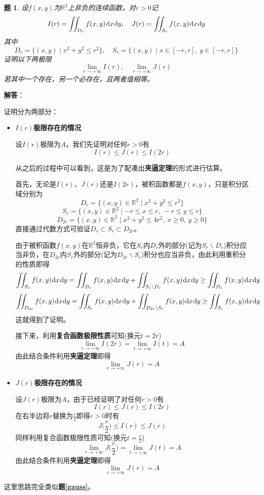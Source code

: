 \documentclass[a4paper,UTF8,fontset=windows,AutoFakeBold]{ctexart}
\newcommand*{\dr}{\hspace{0.07em}\mathrm{d}}
\newcommand*{\rb}{\mathbb{R}}
\newcommand*{\note}{\noindent *}
\theoremstyle{ex}
\newtheorem{exercise}{题}
\newcommand{\exref}[1]{\textbf{题\;\ref{#1}\;}}
\newcommand{\sol}[1]{{\vspace{5pt}\kaishu\noindent\textbf{解答}：\vspace{-3pt}
\begin{compactitem}
    \item[] #1
\end{compactitem}
}}
\begin{document}
\begin{framed}
\begin{exercise}
    设$f(x,y)$为$\rb^2$上非负的连续函数，对$r>0$记
    $$I(r)=\iint_{D_r}f(x,y)\dr x\dr y,\quad J(r)=\iint_{S_r}f(x,y)\dr x\dr y$$
    其中
    $$D_r=\{(x,y)\mid x^2+y^2\le r^2\},\quad S_r=\{(x,y)\mid x\in[-r,r],\ y\in[-r,r]\}$$
    证明以下两极限
    $$\lim_{r\to+\infty}I(r),\quad\lim_{r\to+\infty}J(r)$$
    若其中一个存在，另一个必存在，且两者值相等。
\end{exercise}
\sol{
    证明分为两部分：
    \begin{itemize}
        \item $I(r)$\textbf{极限存在的情况}
        
        设$I(r)$极限为$A$，我们先证明对任何$r>0$有
        $$I(r)\le J(r)\le I(2r)$$

        \note 从之后的过程中可以看到，这是为了配凑出\textbf{夹逼定理}的形式进行估算。

        首先，无论是$I(r)$、$J(r)$还是$I(2r)$，被积函数都是$f(x,y)$，只是积分区域分别为
        $$D_r=\{(x,y)\in\rb^2\mid x^2+y^2\le r^2\}$$
        $$S_r=\{(x,y)\in\rb^2\mid-r\le x\le r,\ -r\le y\le r\}$$
        $$D_{2r}=\{(x,y)\in\rb^2\mid x^2+y^2\le 4r^2,\ x\ge0,\ y\ge0\}$$
        直接通过代数方式可验证$D_r\subset S_r\subset D_{2r}$。

        由于被积函数$f(x,y)$在$\rb^2$恒非负，它在$S_r$内$D_r$外的部分(记为$S_r\backslash D_r$)积分应当非负，在$D_{2r}$内$S_r$外的部分(记为$D_{2r}\backslash S_r$)积分也应当非负，由此利用重积分的性质即得
        $$\iint_{S_r}f(x,y)\dr x\dr y=\iint_{D_r}f(x,y)\dr x\dr y+\iint_{S_r\backslash D_r}f(x,y)\dr x\dr y\ge\iint_{D_r}f(x,y)\dr x\dr y$$
        $$\iint_{D_{2r}}f(x,y)\dr x\dr y=\iint_{S_r}f(x,y)\dr x\dr y+\iint_{D_{2r}\backslash S_r}f(x,y)\dr x\dr y\ge\iint_{S_r}f(x,y)\dr x\dr y$$
        这就得到了证明。

        接下来，利用\textbf{复合函数极限性质}可知(换元$t=2r$)
        $$\lim_{r\to+\infty}I(2r)=\lim_{t\to+\infty}I(t)=A$$
        由此结合条件利用\textbf{夹逼定理}即得
        $$\lim_{r\to+\infty}J(r)=A$$

        \item $J(r)$\textbf{极限存在的情况}
        
        设$J(r)$极限为$A$，由于已经证明了对任何$r>0$有
        $$I(r)\le J(r)\le I(2r)$$
        在右半边将$r$替换为$\frac{r}{2}$即得$r>0$时有
        $$J\bigg(\frac{r}{2}\bigg)\le I(r)\le J(r)$$
        同样利用复合函数极限性质可知(换元$t=\frac{r}{2}$)
        $$\lim_{r\to+\infty}J\bigg(\frac{r}{2}\bigg)=\lim_{t\to+\infty}J(t)=A$$
        由此结合条件利用\textbf{夹逼定理}即得
        $$\lim_{r\to+\infty}J(r)=A$$
    \end{itemize}

    \note 这里思路完全类似\exref{gauss}。
}
\end{framed}
\end{document}
